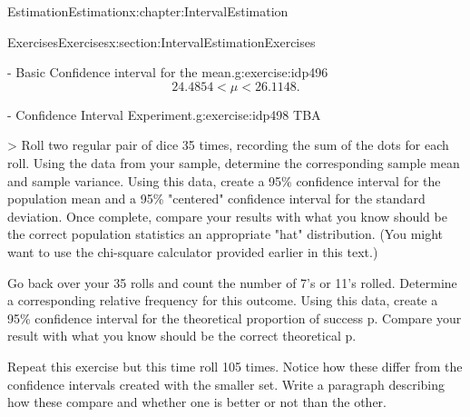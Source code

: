 \documentclass[oneside,10pt,]{book}
\numberwithin{equation}{section}
\newcommand{\lt}{<}
\begin{document}
\begin{chapterptx}{Estimation}{}{Estimation}{}{}{x:chapter:IntervalEstimation}
\begin{sectionptx}{Exercises}{}{Exercises}{}{}{x:section:IntervalEstimationExercises}
\begin{inlineexercise}{- Basic Confidence interval for the mean.}{g:exercise:idp496}
\begin{equation*}
24.4854 \lt \mu \lt 26.1148.
\end{equation*}
%
\end{inlineexercise}%
\begin{inlineexercise}{- Confidence Interval Experiment.}{g:exercise:idp498}%
TBA%
\end{inlineexercise}%
 \textgreater{} Roll two regular pair of dice 35 times, recording the sum of the dots for each roll.  Using the data from your sample, determine the corresponding sample mean and sample variance.  Using this data, create a 95\% confidence interval for the population mean and a 95\% "centered" confidence interval for the standard deviation. Once complete, compare your results with what you know should be the correct population statistics an appropriate "hat" distribution. (You might want to use the chi-square calculator provided earlier in this text.)%
\par
Go back over your 35 rolls and count the number of 7's or 11's rolled. Determine a corresponding relative frequency for this outcome. Using this data, create a 95\% confidence interval for the theoretical proportion of success p.  Compare your result with what you know should be the correct theoretical p.%
\par
Repeat this exercise but this time roll 105 times.  Notice how these differ from the confidence intervals created with the smaller set.  Write a paragraph describing how these compare and whether one is better or not than the other.%
\end{sectionptx}
\end{chapterptx}
%
%
\typeout{************************************************}
\typeout{************************************************}
%
\end{document}
